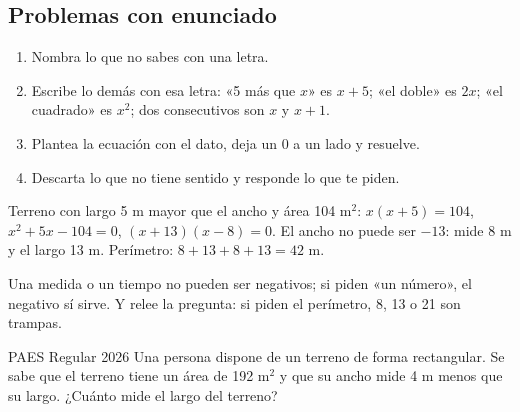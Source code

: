 \subsection{Problemas con enunciado}
\begin{enumerate}
  \item Nombra lo que no sabes con una letra.
  \item Escribe lo demás con esa letra: «5 más que $x$» es $x + 5$; «el doble» es $2x$; «el cuadrado» es $x^2$; dos consecutivos son $x$ y $x + 1$.
  \item Plantea la ecuación con el dato, deja un 0 a un lado y resuelve.
  \item Descarta lo que no tiene sentido y responde lo que te piden.
\end{enumerate}
\begin{ejemplo} Terreno con largo 5 m mayor que el ancho y área 104 m$^2$: $x(x + 5) = 104$, $x^2 + 5x - 104 = 0$, $(x + 13)(x - 8) = 0$. El ancho no puede ser $-13$: mide 8 m y el largo 13 m. Perímetro: $8 + 13 + 8 + 13 = 42$ m.\end{ejemplo}
\begin{ojo} Una medida o un tiempo no pueden ser negativos; si piden «un número», el negativo sí sirve. Y relee la pregunta: si piden el perímetro, 8, 13 o 21 son trampas.\end{ojo}

\begin{elejemplo}{PAES Regular 2026}
Una persona dispone de un terreno de forma rectangular. Se sabe que el terreno tiene un área de 192 m$^2$ y que su ancho mide 4 m menos que su largo. ¿Cuánto mide el largo del terreno?
\end{elejemplo}

